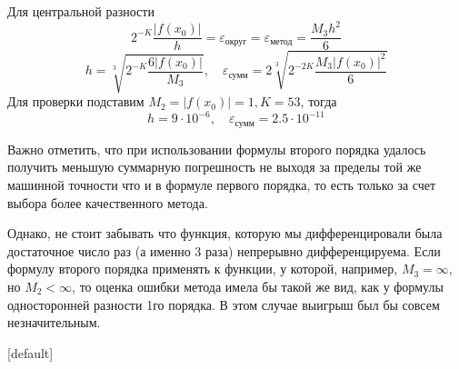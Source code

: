 \documentclass[professionalfonts,compress,unicode]{beamer}
\begin{document}
{
	Для центральной разности
	$$
	2^{-K} \frac{|f(x_0)|}{h} = \varepsilon_{\text{округ}} = \varepsilon_{\text{метод}} = \frac{M_3 h^2}{6}
	$$
	$$
	h = \sqrt[3]{2^{-K}\frac{6|f(x_0)|}{M_3}},\quad \varepsilon_{\text{сумм}} = 2 \sqrt[3]{2^{-2K} \frac{M_3 |f(x_0)|^2}{6}}
	$$
	Для проверки подставим $M_2 = |f(x_0)| = 1, K=53$, тогда
	$$h=9 \cdot 10^{-6},  \quad \varepsilon_{\text{сумм}} = 2.5 \cdot 10^{-11}$$
}

{
	Важно отметить, что при использовании формулы второго порядка удалось получить меньшую суммарную погрешность
	не выходя за пределы той же машинной точности что и в формуле первого порядка, то есть только за счет выбора 
	более качественного метода. 
	\pause
	
	Однако, не стоит забывать что функция, которую мы дифференцировали была достаточное 
	число раз (а именно 3 раза) непрерывно дифференцируема. Если формулу второго порядка применять
	к функции, у которой, например, $M_3 = \infty$, но $M_2 < \infty$, то оценка ошибки метода имела бы 
	такой же вид, как у формулы односторонней разности 1го порядка. В этом случае выигрыш был бы совсем 
	незначительным.
}

{
[default] 
}
\end{document}
